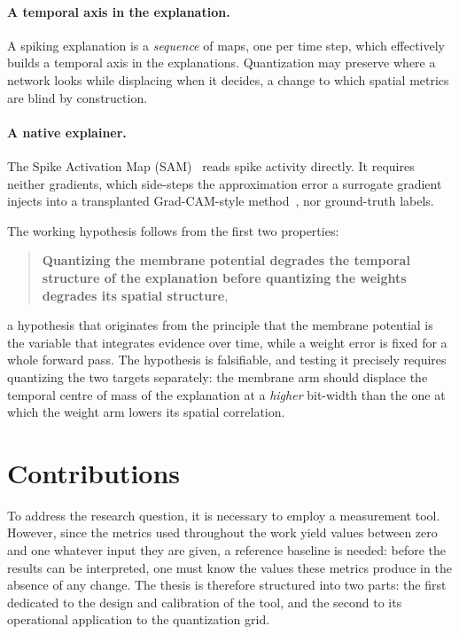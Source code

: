 \paragraph{A temporal axis in the explanation.} A spiking explanation is a
\emph{sequence} of maps, one per time step, which effectively builds a temporal axis in the explanations.
Quantization may preserve where a network looks while displacing when it decides,
a change to which spatial metrics are blind by construction.

\paragraph{A native explainer.} The Spike Activation Map (SAM)~\cite{kim2021sam}
reads spike activity directly. It requires neither gradients, which side-steps
the approximation error a surrogate gradient injects into a transplanted
Grad-CAM-style method~\cite{selvaraju2017gradcam}, nor ground-truth labels.

The working hypothesis follows from the first two properties:

\begin{quote}
\textbf{Quantizing the membrane potential degrades the temporal structure of the
explanation before quantizing the weights degrades its spatial structure},
\end{quote}

a hypothesis that originates from the principle that the membrane potential
is the variable that integrates evidence over time,
while a weight error is fixed for a whole forward pass. The hypothesis is
falsifiable, and testing it precisely requires quantizing the two targets separately: the
membrane arm should displace the temporal centre of mass of the explanation at a
\emph{higher} bit-width than the one at which the weight arm lowers its spatial
correlation.

\section{Contributions}

To address the research question, it is necessary to employ a measurement tool.
However, since the metrics used throughout the work yield values between zero and one whatever
input they are given, a reference baseline is needed: before the results can
be interpreted, one must know the values these metrics produce in the absence of
any change. The thesis is therefore structured into two parts: the first dedicated to the design and calibration
of the tool, and the second to its operational application to the quantization grid.

